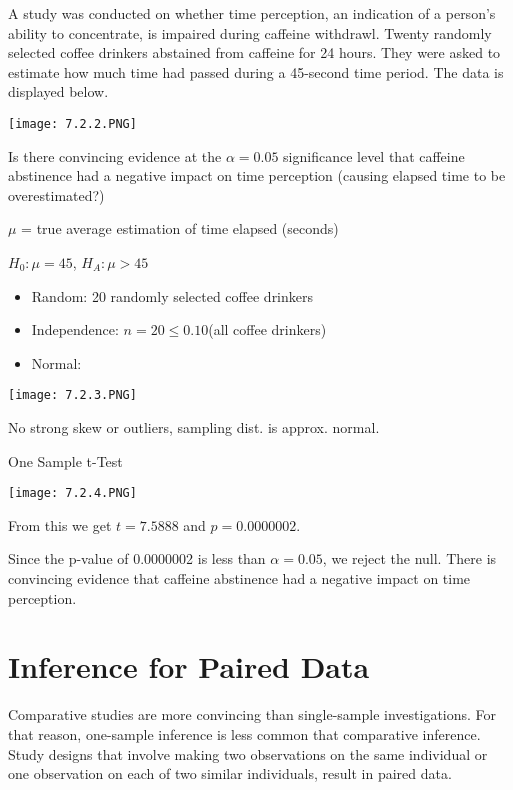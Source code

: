 \documentclass[../stats.tex]{subfiles}
\begin{document}
\pagebreak
\begin{example}
    A study was conducted on whether time perception, an indication of a person's ability to concentrate, is impaired during caffeine withdrawl. Twenty randomly selected coffee drinkers abstained from caffeine for 24 hours.
    They were asked to estimate how much time had passed during a 45-second time period. The data is displayed below.
    \begin{center}
        \texttt{[image: 7.2.2.PNG]}
    \end{center}
    Is there convincing evidence at the $\alpha=0.05$ significance level that caffeine abstinence had a negative impact on time perception (causing elapsed time to be overestimated?)

    $\mu$ = true average estimation of time elapsed (seconds)

    $H_0: \mu=45$, $H_A: \mu>45$

    \begin{itemize}
        \item Random: 20 randomly selected coffee drinkers 
        \item Independence: $n=20\leq 0.10$(all coffee drinkers)
        \item Normal:
    \end{itemize}
    \begin{center}
        \texttt{[image: 7.2.3.PNG]}
    \end{center}
    No strong skew or outliers, sampling dist. is approx. normal.

    One Sample t-Test 

    \begin{center}
        \texttt{[image: 7.2.4.PNG]}
    \end{center}
    From this we get $t=7.5888$ and $p=0.0000002$.

    Since the p-value of 0.0000002 is less than $\alpha=0.05$, we reject the null. There is convincing evidence that caffeine abstinence had a negative impact on time perception.
\end{example}


\section{Inference for Paired Data}
Comparative studies are more convincing than single-sample investigations. For that reason, one-sample inference is less common that comparative inference. Study designs that involve making two observations 
on the same individual or one observation on each of two similar individuals, result in paired data.
\end{document}
